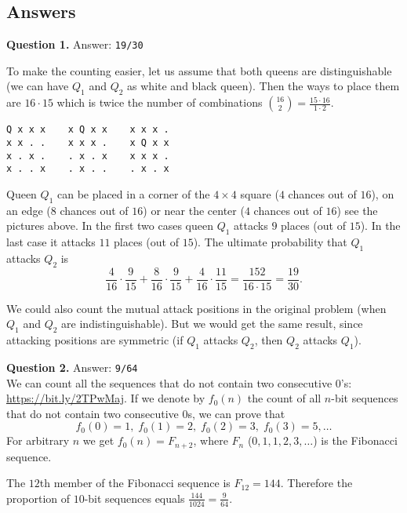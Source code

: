 \documentclass[jou]{apa6}
\begin{document}
\subsection{Answers}

\vspace{10pt}
{\bf Question 1.} Answer: {\tt 19/30}

To make the counting easier, let us assume that both queens are distinguishable 
(we can have $Q_1$ and $Q_2$ as white and black queen). 
Then the ways to place them are $16 \cdot 15$ \textendash{} which is twice the number 
of combinations ${16 \choose 2} = \frac{15 \cdot 16}{1 \cdot 2}$. 

\begin{verbatim}
Q x x x    x Q x x    x x x .
x x . .    x x x .    x Q x x
x . x .    . x . x    x x x .
x . . x    . x . .    . x . x
\end{verbatim}

Queen $Q_1$ can be placed in a corner of the $4 \times 4$ square ($4$ chances out of $16$), 
on an edge ($8$ chances out of $16$) or near the center ($4$ chances out of $16$)
\textendash{} see the pictures above.
In the first two cases queen $Q_1$ attacks $9$ places (out of $15$). In the last case
it attacks $11$ places (out of $15$). The ultimate probability that $Q_1$ attacks $Q_2$ 
is
$$\frac{4}{16} \cdot \frac{9}{15} + \frac{8}{16} \cdot \frac{9}{15} + \frac{4}{16} \cdot \frac{11}{15} = \frac{152}{16 \cdot 15} = 
\frac{19}{30}.$$

We could also count the mutual attack positions in the original problem (when $Q_1$ and $Q_2$ 
are indistinguishable). But we would get the same result, since attacking positions
are symmetric (if $Q_1$ attacks $Q_2$, then $Q_2$ attacks $Q_1$).





\vspace{10pt}
{\bf Question 2.} Answer: {\tt 9/64}\\
We can count all the sequences that do not contain two consecutive 0's: \url{https://bit.ly/2TPwMaj}.
If we denote by $f_0(n)$ the count of all $n$-bit sequences that do not contain two consecutive 0s, 
we can prove that 
$$f_0(0)=1,\;f_0(1)=2,\;f_0(2)=3,\;f_0(3)=5,\ldots$$
For arbitrary $n$ we get $f_0(n) = F_{n+2}$, where $F_{n}$ ($0,1,1,2,3,\ldots$) is the 
Fibonacci sequence. 

The $12$th member of the Fibonacci sequence is $F_{12}=144$. 
Therefore the proportion of $10$-bit sequences equals $\frac{144}{1024}=\frac{9}{64}$.
\end{document}

